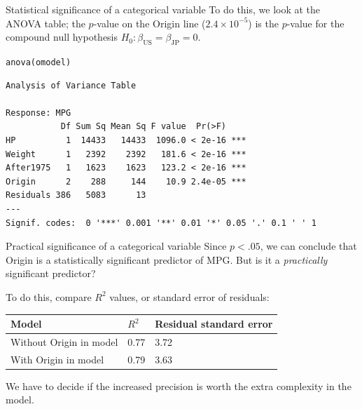 \documentclass{beamer}\usepackage[]{graphicx}\usepackage[]{color}
\makeatletter
\newcommand{\hlstd}[1]{\textcolor[rgb]{1,0.894,0.769}{#1}}%
\newcommand{\hlkwd}[1]{\textcolor[rgb]{1,0.78,0.769}{#1}}%
\newenvironment{kframe}{%
 \def\at@end@of@kframe{}%
 \ifinner\ifhmode%
  \def\at@end@of@kframe{\end{minipage}}%
  \begin{minipage}{\columnwidth}%
 \fi\fi%
 \def\FrameCommand##1{\hskip\@totalleftmargin \hskip-\fboxsep
 \colorbox{shadecolor}{##1}\hskip-\fboxsep
     \hskip-\linewidth \hskip-\@totalleftmargin \hskip\columnwidth}%
 \MakeFramed {\advance\hsize-\width
   \@totalleftmargin\z@ \linewidth\hsize
   \@setminipage}}%
 {\par\unskip\endMakeFramed%
 \at@end@of@kframe}
\newenvironment{knitrout}{}{} %
\makeatother
\begin{document}
\begin{darkframes}
\begin{frame}[fragile]{Statistical significance of a categorical variable}
        To do this, we look at the ANOVA table; the $p$-value on the Origin line ($2.4 \times 10^{-5}$) is the $p$-value for the compound null hypothesis $H_0 : \beta_{\text{US}} = \beta_{\text{JP}} = 0$.
        \fontsize{9}{9}\selectfont
\begin{knitrout}
\begin{kframe}
\begin{alltt}
\hlkwd{anova}\hlstd{(omodel)}
\end{alltt}
\begin{verbatim}
Analysis of Variance Table

Response: MPG
           Df Sum Sq Mean Sq F value  Pr(>F)    
HP          1  14433   14433  1096.0 < 2e-16 ***
Weight      1   2392    2392   181.6 < 2e-16 ***
After1975   1   1623    1623   123.2 < 2e-16 ***
Origin      2    288     144    10.9 2.4e-05 ***
Residuals 386   5083      13                    
---
Signif. codes:  0 '***' 0.001 '**' 0.01 '*' 0.05 '.' 0.1 ' ' 1
\end{verbatim}
\end{kframe}
\end{knitrout}
\end{frame}
      
\begin{frame}{Practical significance of a categorical variable}
        Since $p<.05$, we can conclude that Origin is a statistically significant predictor of MPG.
        But is it a \emph{practically} significant predictor?
        
        \bigskip\pause
        
        To do this, compare $R^2$ values, or standard error of residuals:

        \bigskip

        \begin{tabular}{lll}
        \textbf{Model} & \textbf{$R^2$} & \textbf{Residual standard error} \\
        \hline
        Without Origin in model & 0.77 & 3.72 \\
        With Origin in model & 0.79 & 3.63 \\
        \hline
        \end{tabular}

        \bigskip

        We have to decide if the increased precision is worth the extra complexity in the model.
\end{frame}
 
  \end{darkframes}
\end{document}
